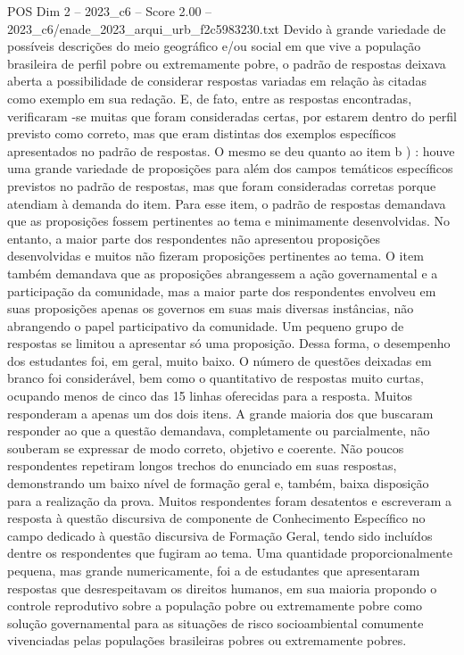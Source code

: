 \begin{textsample}{POS Dim 2 – 2023\_c6 – Score 2.00 – 2023\_c6/enade\_2023\_arqui\_urb\_f2c5983230.txt}
Devido à grande variedade de possíveis descrições do meio geográfico e/ou social em que vive a população brasileira de perfil pobre ou extremamente pobre, o padrão de respostas deixava aberta a possibilidade de considerar respostas variadas em relação às citadas como exemplo em sua redação.
E, de fato, entre as respostas encontradas, verificaram -se muitas que foram consideradas certas, por estarem dentro do perfil previsto como correto, mas que eram distintas dos exemplos específicos apresentados no padrão de respostas.
O mesmo se deu quanto ao item b ) : houve uma grande variedade de proposições para além dos campos temáticos específicos previstos no padrão de respostas, mas que foram consideradas corretas porque atendiam à demanda do item.
Para esse item, o padrão de respostas demandava que as proposições fossem pertinentes ao tema e minimamente desenvolvidas.
No entanto, a maior parte dos respondentes não apresentou proposições desenvolvidas e muitos não fizeram proposições pertinentes ao tema.
O item também demandava que as proposições abrangessem a ação governamental e a participação da comunidade, mas a maior parte dos respondentes envolveu em suas proposições apenas os governos em suas mais diversas instâncias, não abrangendo o papel participativo da comunidade.
Um pequeno grupo de respostas se limitou a apresentar só uma proposição.
Dessa forma, o desempenho dos estudantes foi, em geral, muito baixo.
O número de questões deixadas em branco foi considerável, bem como o quantitativo de respostas muito curtas, ocupando menos de cinco das 15 linhas oferecidas para a resposta.
Muitos responderam a apenas um dos dois itens.
A grande maioria dos que buscaram responder ao que a questão demandava, completamente ou parcialmente, não souberam se expressar de modo correto, objetivo e coerente.
Não poucos respondentes repetiram longos trechos do enunciado em suas respostas, demonstrando um baixo nível de formação geral e, também, baixa disposição para a realização da prova.
Muitos respondentes foram desatentos e escreveram a resposta à questão discursiva de componente de Conhecimento Específico no campo dedicado à questão discursiva de Formação Geral, tendo sido incluídos dentre os respondentes que fugiram ao tema.
Uma quantidade proporcionalmente pequena, mas grande numericamente, foi a de estudantes que apresentaram respostas que desrespeitavam os direitos humanos, em sua maioria propondo o controle reprodutivo sobre a população pobre ou extremamente pobre como solução governamental para as situações de risco socioambiental comumente vivenciadas pelas populações brasileiras pobres ou extremamente pobres.

\end{textsample}
